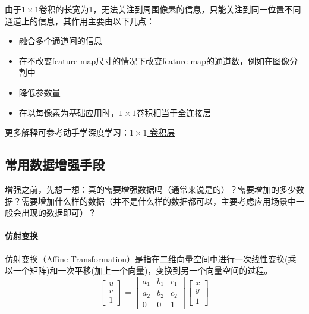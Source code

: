 由于$1\times 1$卷积的长宽为1，无法关注到周围像素的信息，只能关注到同一位置不同通道上的信息，其作用主要由以下几点：
\begin{itemize}
	\item 融合多个通道间的信息
	\item 在不改变feature map尺寸的情况下改变feature map的通道数，例如在图像分割中
	\item 降低参数量
	\item 在以每像素为基础应用时，$1\times 1$卷积相当于全连接层
\end{itemize}
更多解释可参考动手学深度学习：\href{https://zh-v2.d2l.ai/chapter_convolutional-neural-networks/channels.html#times-1}{$1\times 1$  卷积层}

\subsection{常用数据增强手段}
增强之前，先想一想：真的需要增强数据吗（通常来说是的）？需要增加的多少数据？需要增加什么样的数据（并不是什么样的数据都可以，主要考虑应用场景中一般会出现的数据即可）？
\paragraph{仿射变换}
仿射变换（Affine Transformation）是指在二维向量空间中进行一次线性变换(乘以一个矩阵)和一次平移(加上一个向量)，变换到另一个向量空间的过程。
$$
\left[\begin{array}{l}
	u \\
	v \\
	1
\end{array}\right]=\left[\begin{array}{ccc}
	a_{1} & b_{1} & c_{1} \\
	a_{2} & b_{2} & c_{2} \\
	0 & 0 & 1
\end{array}\right]\left[\begin{array}{l}
	x \\
	y \\
	1
\end{array}\right]
$$

